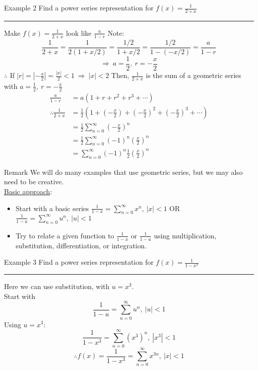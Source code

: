 \documentclass[12pt,a4paper]{article}
\begin{document}
\begin{eg}{Example 2}
	Find a power series representation for $\displaystyle f(x)=\frac{1}{2+x}$\\
	\noindent\rule[0.25\baselineskip]{\textwidth}{1pt}
	Make $\displaystyle f(x)=\frac{1}{2+x}$ look like $\displaystyle\frac{a}{1-r}$
	Note: 
	$$\frac{1}{2+x}=\frac{1}{2(1+x/2)}=\frac{1/2}{1+x/2}=\frac{1/2}{1-(-x/2)}=\frac{a}{1-r}$$
	$$\Rightarrow\ a=\frac{1}{2},\ r=-\frac{x}{2}$$
	$\therefore$ If $\displaystyle |r|=\left|-\frac{x}{2}\right|=\frac{|x|}{2}<1\ \Rightarrow\ |x|<2$
	Then, $\displaystyle\frac{1}{2+x}$ is the sum of a geometric series with $\displaystyle a=\frac{1}{2},\ r=-\frac{x}{2}$
	$$\begin{aligned}
		\frac{a}{1-r}&=a(1+r+r^2+r^3+\cdots)\\
		\therefore\frac{1}{2+x}&=\frac{1}{2}\left(1+\left(-\frac{x}{2}\right)+\left(-\frac{x}{2}\right)^2+\left(-\frac{x}{2}\right)^3+\cdots\right)\\
		&=\frac{1}{2}\sum^\infty_{n=0}\left(-\frac{x}{2}\right)^n\\
		&=\frac{1}{2}\sum^\infty_{n=0}(-1)^n\left(\frac{x}{2}\right)^n\\
		&=\sum^\infty_{n=0}(-1)^n\frac{1}{2}\left(\frac{x}{2}\right)^n
	\end{aligned}$$
\end{eg}
\begin{rmk}{Remark}
	We will do many examples that use geometric series, but we may also need to be creative.\\
	\newline
	\underline{Basic approach}:
	\begin{itemize}
		\item Start with a basic series $\displaystyle\frac{1}{1-x}=\sum^\infty_{n=0}x^n,\ |x|<1$ OR $\displaystyle\frac{1}{1-u}=\sum^\infty_{n=0}u^n,\ |u|<1$
		\item Try to relate a given function to $\displaystyle\frac{1}{1-x}$ or $\displaystyle\frac{1}{1-u}$ using multiplication, substitution, differentiation, or integration. 
	\end{itemize}	
\end{rmk}
\begin{eg}{Example 3}
	Find a power series representation for $\displaystyle f(x)=\frac{1}{1-x^3}$\\
	\noindent\rule[0.25\baselineskip]{\textwidth}{1pt}
	Here we can use substitution, with $u=x^3$.\\
	Start with $$\frac{1}{1-u}=\sum^\infty_{n=0}u^n,\ |u|<1$$
	Using $u=x^3$: $$\frac{1}{1-x^3}=\sum^\infty_{n=0}(x^3)^n,\ |x^3|<1$$
	$$\therefore f(x)=\frac{1}{1-x^3}=\sum^\infty_{n=0}x^{3n},\ |x|<1$$
\end{eg}
\end{document}
